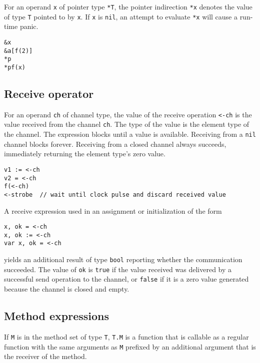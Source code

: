 For an operand \texttt{x} of pointer type \texttt{*T}, the pointer
indirection \texttt{*x} denotes the value of type \texttt{T} pointed to
by \texttt{x}. If \texttt{x} is \texttt{nil}, an attempt to evaluate
\texttt{*x} will cause a run-time panic.

\begin{Verbatim}[frame=single]
&x
&a[f(2)]
*p
*pf(x)
\end{Verbatim}

\subsection*{Receive operator}

For an operand \texttt{ch} of channel type,
the value of the receive operation \texttt{\textless{}-ch} is the value
received from the channel \texttt{ch}. The type of the value is the
element type of the channel. The expression blocks until a value is
available. Receiving from a \texttt{nil} channel blocks forever.
Receiving from a closed channel always succeeds,
immediately returning the element type's
zero value.

\begin{Verbatim}[frame=single]
v1 := <-ch
v2 = <-ch
f(<-ch)
<-strobe  // wait until clock pulse and discard received value
\end{Verbatim}

A receive expression used in an assignment or initialization of the form

\begin{Verbatim}[frame=single]
x, ok = <-ch
x, ok := <-ch
var x, ok = <-ch
\end{Verbatim}

yields an additional result of type \texttt{bool} reporting whether the
communication succeeded. The value of \texttt{ok} is \texttt{true} if
the value received was delivered by a successful send operation to the
channel, or \texttt{false} if it is a zero value generated because the
channel is closed and empty.

\subsection*{Method expressions}

If \texttt{M} is in the method set of type
\texttt{T}, \texttt{T.M} is a function that is callable as a regular
function with the same arguments as \texttt{M} prefixed by an additional
argument that is the receiver of the method.


